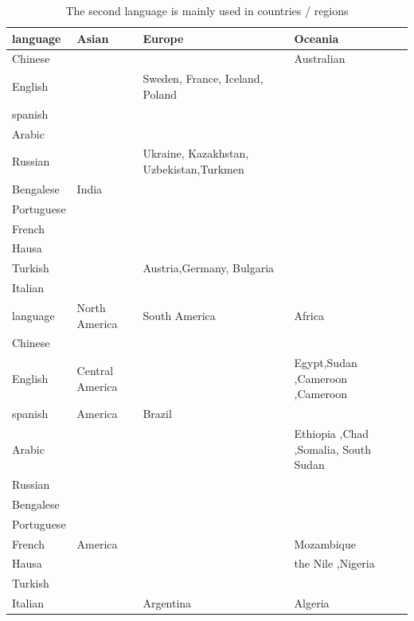 \begin{table}[H]
	\centering
	\caption{ The second language is mainly used in countries / regions}
	\begin{tabular}{l|l|p{4cm} |p{4cm}}
		\toprule
		language & Asian & Europe & Oceania \\
		\midrule
		Chinese &       &       & Australian \\
			\midrule
		English &       & Sweden, France, Iceland, Poland &  \\	\midrule
		spanish &       &       &  \\	\midrule
		Arabic &       &       &  \\	\midrule
		Russian &       &Ukraine, Kazakhstan, Uzbekistan,Turkmen&  \\	\midrule
		Bengalese & India&       &  \\	\midrule
		Portuguese &       &       &  \\	\midrule
		French &       &       &  \\	\midrule
		Hausa &       &       &  \\	\midrule
		Turkish &       & Austria,Germany, Bulgaria &  \\	\midrule
		Italian &       &       &  \\
		\bottomrule
		\toprule
		language & North America& South America &  Africa \\
		\midrule
		Chinese &       &       &  \\	\midrule
		English & Central America & & Egypt,Sudan ,Cameroon ,Cameroon \\	\midrule
		spanish & \multicolumn{1}{l}{America} & Brazil &  \\	\midrule
		Arabic &       &       & Ethiopia ,Chad ,Somalia, South Sudan \\	\midrule
		Russian &       &       &  \\	\midrule
		Bengalese &       &       &  \\	\midrule
		Portuguese &       &       &  \\	\midrule
		French & America&       & Mozambique \\	\midrule
		Hausa &       &       & the Nile ,Nigeria \\	\midrule
		Turkish &       &       &  \\	\midrule
		Italian &       & Argentina & Algeria \\	\midrule
		\bottomrule
	\end{tabular}%
	\label{tab:addlabel}%
\end{table}%


